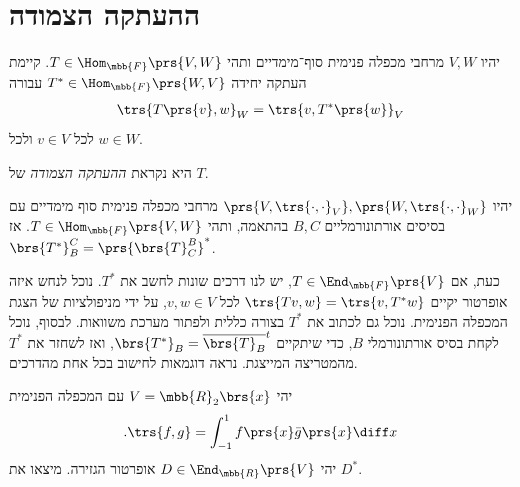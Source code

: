 \documentclass[a4paper,10pt,twoside,openany]{book}
\begin{document}
\section{ההעתקה הצמודה}

\begin{theorem}
יהיו
$V,W$
מרחבי מכפלה פנימית סוף־מימדיים ותהי
$T \in \Hom_{\mbb{F}}\prs{V,W}$.
קיימת העתקה יחידה
$T^* \in \Hom_{\mbb{F}}\prs{W,V}$
עבורה
\begin{align*}
\trs{T\prs{v}, w}_W = \trs{v, T^*\prs{w}}_V
\end{align*}
לכל
$v \in V$
ולכל
$w \in W$.

היא נקראת
\emph{ההעתקה הצמודה}
של
$T$.
\end{theorem}

\begin{theorem}
יהיו
$\prs{V, \trs{\cdot, \cdot}_V}, \prs{W, \trs{\cdot, \cdot}_W}$
מרחבי מכפלה פנימית סוף מימדיים עם בסיסים אורתונורמליים
$B,C$
בהתאמה, ותהי
$T \in \Hom_{\mbb{F}}\prs{V,W}$.
אז
$\brs{T^*}^C_B = \prs{\brs{T}^B_C}^*$.
\end{theorem}

כעת, אם
$T \in \End_{\mbb{F}}\prs{V}$,
יש לנו דרכים שונות לחשב את
$T^*$.
נוכל לנחש איזה אופרטור יקיים
$\trs{Tv, w} = \trs{v, T^* w}$
לכל
$v,w \in V$,
על ידי מניפולציות של הצגת המכפלה הפנימית.
נוכל גם לכתוב את
$T^*$
בצורה כללית ולפתור מערכת משוואות.
לבסוף, נוכל לקחת בסיס אורתונורמלי
$B$,
כדי שיתקיים
$\brs{T^*}_B = \overline{\brs{T}_B}^t$,
ואז לשחזר את
$T^*$
מהמטריצה המייצגת.
נראה דוגמאות לחישוב בכל אחת מהדרכים.

\begin{exercisechap}
יהי
$V = \mbb{R}_2\brs{x}$
עם המכפלה הפנימית
\[\text{.} \trs{f,g} = \int_{-1}^1 f\prs{x} \bar{g}\prs{x} \diff x\]
יהי
$D \in \End_{\mbb{R}}\prs{V}$
אופרטור הגזירה.
מיצאו את
$D^*$.
\end{exercisechap}
\end{document}
